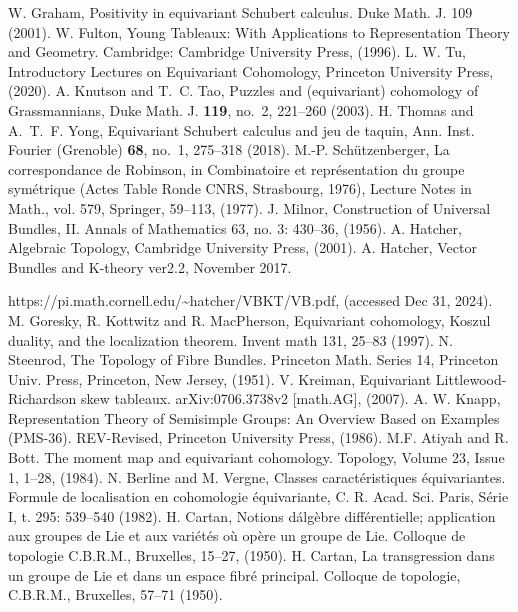 \begin{thebibliography}{99}
  
   W. Graham, Positivity in equivariant Schubert calculus. Duke Math. J. 109 (2001).
   W. Fulton, Young Tableaux: With Applications to Representation Theory and Geometry. Cambridge: Cambridge University Press, (1996).
   L. W. Tu, Introductory Lectures on Equivariant Cohomology, Princeton University Press, (2020).
   A. Knutson and T.~C. Tao, Puzzles and (equivariant) cohomology of Grassmannians, Duke Math. J. {\bf 119}, no.~2, 221--260  (2003).
   H. Thomas and A.~T.~F. Yong, Equivariant Schubert calculus and jeu de taquin, Ann. Inst. Fourier (Grenoble) {\bf 68}, no.~1, 275--318 (2018). 
  M.-P. Schützenberger, La correspondance de Robinson, in Combinatoire et
  repr\'esentation du groupe sym\'etrique (Actes Table Ronde CNRS, Strasbourg, 1976),
  Lecture Notes in Math., vol. 579, Springer, 59--113, (1977).
   J. Milnor, Construction of Universal Bundles, II. Annals of Mathematics 63, no. 3: 430--36, (1956).
   A. Hatcher, Algebraic Topology, Cambridge University Press, (2001).
   A. Hatcher, Vector Bundles and K-theory ver2.2, November 2017. 
  
  https://pi.math.cornell.edu/\textasciitilde hatcher/VBKT/VB.pdf, (accessed Dec 31, 2024).
   M. Goresky, R. Kottwitz and R. MacPherson, Equivariant cohomology, Koszul duality, and the localization theorem. Invent math 131, 25--83 (1997).
   N. Steenrod, The Topology of Fibre Bundles. Princeton Math. Series 14,
  Princeton Univ. Press, Princeton, New Jersey, (1951).
   V. Kreiman, Equivariant Littlewood-Richardson skew tableaux. arXiv:0706.3738v2 [math.AG], (2007).
   A. W. Knapp, Representation Theory of Semisimple Groups: An Overview Based on Examples (PMS-36). REV-Revised, Princeton University Press, (1986). 
   M.F. Atiyah and R. Bott.
  The moment map and equivariant cohomology.
  Topology,
  Volume 23, Issue 1, 1--28, (1984).
   N. Berline and M. Vergne, Classes caract\'eristiques \'equivariantes. Formule
  de localisation en cohomologie \'equivariante, C. R. Acad. Sci. Paris, S\'erie
  I, t. 295: 539--540 (1982).
  H. Cartan, Notions d\'alg\`ebre diff\' erentielle; application aux groupes de Lie et aux vari\'et\' es o\`u op\`ere un
  groupe de Lie. Colloque de topologie C.B.R.M., Bruxelles, 15--27, (1950).
  H. Cartan, La transgression dans un groupe de Lie et dans un espace fibr\'e principal. Colloque de
  topologie, C.B.R.M., Bruxelles, 57--71 (1950).
\end{thebibliography}